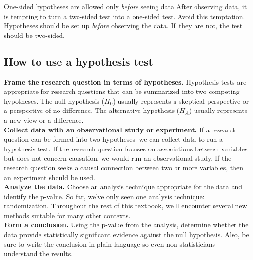 \begin{caution}{One-sided hypotheses are allowed only \emph{before} seeing data}
{After observing data, it is tempting to turn a two-sided test into a one-sided test. Avoid this temptation. Hypotheses should be set up \emph{before} observing the data. If~they are not, the test should be two-sided.}
\end{caution}




\subsection{How to use a hypothesis test}

\noindent\textbf{Frame the research question in terms of hypotheses.} Hypothesis tests are appropriate for research questions that can be summarized into two competing hypotheses. The null hypothesis ($H_0$) usually represents a skeptical perspective or a perspective of no difference. The alternative hypothesis ($H_A$) usually represents a new view or a difference. \\

\noindent\textbf{Collect data with an observational study or experiment.} If a research question can be formed into two hypotheses, we can collect data to run a hypothesis test. If the research question focuses on associations between variables but does not concern causation, we would run an observational study. If the research question seeks a causal connection between two or more variables, then an experiment should be used. \\

\noindent\textbf{Analyze the data.} Choose an analysis technique appropriate for the data and identify the p-value. So far, we've only seen one analysis technique: randomization. Throughout the rest of this textbook, we'll encounter several new methods suitable for many other contexts. \\

\noindent\textbf{Form a conclusion.} Using the p-value from the analysis, determine whether the data provide statistically significant evidence against the null hypothesis. Also, be sure to write the conclusion in plain language so even non-statisticians understand the results.


